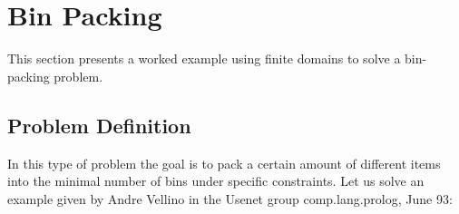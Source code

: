 
\section{Bin Packing}
This section presents a worked example using finite domains to solve a
bin-packing problem.

\subsection{Problem Definition}
In this type of problem the goal is to pack a certain amount of
different items into the minimal number of bins under specific constraints.
Let us solve an example given by Andre Vellino in the Usenet
group comp.lang.prolog, June 93:
